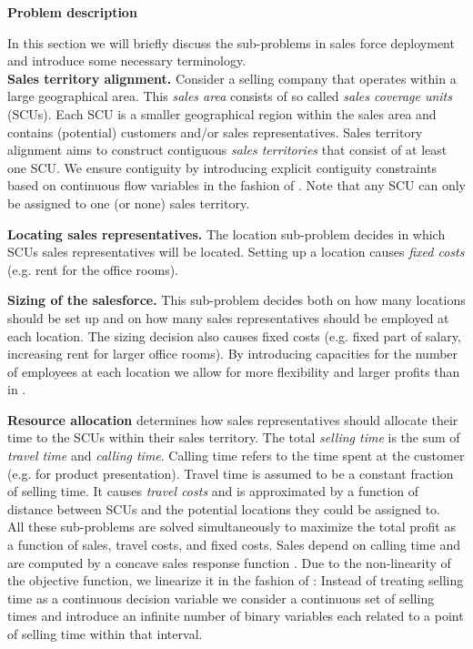 \documentclass[12pt]{scrartcl}
\begin{document}
\begin{section}{\textbf{Problem description}}

In this section we will briefly discuss the sub-problems in sales force deployment and introduce some necessary terminology. \\

\textbf{Sales territory alignment.} Consider a selling company that operates within a large geographical area. This \emph{sales area} consists of so called \emph{sales coverage units} (SCUs). Each SCU is a smaller geographical region within the sales area and contains (potential) customers and/or sales representatives. Sales territory alignment aims to construct contiguous \emph{sales territories} that consist of at least one SCU. We ensure contiguity by introducing explicit contiguity constraints based on continuous flow variables in the fashion of \cite{Shirabe2009}. Note that any SCU can only be assigned to one (or none) sales territory.

\textbf{Locating sales representatives.} The location sub-problem decides in which SCUs sales representatives will be located. Setting up a location causes \emph{fixed costs} (e.g. rent for the office rooms).

\textbf{Sizing of the salesforce.} This sub-problem decides both on how many locations should be set up and on how many sales representatives should be employed at each location. The sizing decision also causes fixed costs (e.g. fixed part of salary, increasing rent for larger office rooms). By introducing capacities for the number of employees at each location we allow for more flexibility and larger profits than in \cite{Haase2014}.

\textbf{Resource allocation} determines how sales representatives should allocate their time to the SCUs within their sales territory. The total \emph{selling time} is the sum of \emph{travel time} and \emph{calling time}. Calling time refers to the time spent at the customer (e.g. for product presentation). Travel time is assumed to be a constant fraction of selling time. It causes \emph{travel costs} and is approximated by a function of distance between SCUs and the potential locations they could be assigned to. \\

All these sub-problems are solved simultaneously to maximize the total profit as a function of sales, travel costs, and fixed costs. Sales depend on calling time and are computed by a concave sales response function \citep{Skiera1998}. Due to the non-linearity of the objective function, we linearize it in the fashion of \cite{Haase2014}: Instead of treating selling time as a continuous decision variable we consider a continuous set of selling times and introduce an infinite number of binary variables each related to a point of selling time within that interval. 


\end{section}
\end{document}
